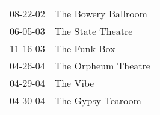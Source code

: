 \begin{supertabular}{p{0.07\textwidth}p{0.23\textwidth}}
 08-22-02 &  The Bowery Ballroom \\
 06-05-03 &    The State Theatre \\
 11-16-03 &         The Funk Box \\
 04-26-04 &  The Orpheum Theatre \\
 04-29-04 &             The Vibe \\
 04-30-04 &    The Gypsy Tearoom \\
\end{supertabular}
